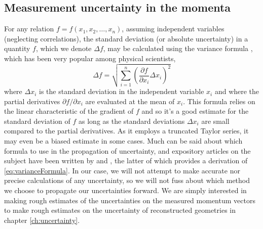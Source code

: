 \subsection{Measurement uncertainty in the momenta} \label{ssec:measurementUncertainty}
For any relation $f = f(x_1, x_2, \dots, x_n)$, assuming independent variables (neglecting correlations), the standard deviation (or absolute uncertainty) in a quantity $f$, which we denote $\Delta f$, may be calculated using the variance formula \citep{Ku1966}, which has been very popular among physical scientists,
\begin{equation} \label{eq:varianceFormula}
\Delta f = \sqrt{\sum_{i=1}^{n} \left( \frac{\partial f}{\partial x_i} \Delta x_i \right)^2}
\end{equation}
where $\Delta x_i$ is the standard deviation in the independent variable $x_i$ and where the partial derivatives $\partial f/\partial x_i$ are evaluated at the mean of $x_i$. This formula relies on the linear characteristic of the gradient of $f$ and so it's a good estimate for the standard deviation of $f$ as long as the standard deviations $\Delta x_i$ are small compared to the partial derivatives. As it employs a truncated Taylor series, it may even be a biased estimate in some cases. Much can be said about which formula to use in the propagation of uncertainty, and expository articles on the subject have been written by \citet{Birge39} and \citet{Ku1966}, the latter of which provides a derivation of \eqref{eq:varianceFormula}. In our case, we will not attempt to make accurate nor precise calculations of any uncertainty, so we will not fuss about which method we choose to propagate our uncertainties forward. We are simply interested in making rough estimates of the uncertainties on the measured momentum vectors to make rough estimates on the uncertainty of reconstructed geometries in chapter \ref{ch:uncertainty}.


